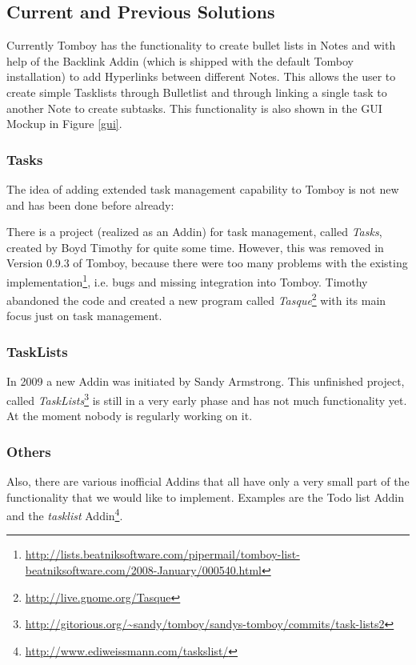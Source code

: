 \subsection{Current and Previous Solutions}
\label{description:solution}
Currently Tomboy has the functionality to create bullet lists in Notes and with help of the Backlink Addin (which is shipped with the default Tomboy installation) to add Hyperlinks between different Notes. This allows the user to create simple Tasklists through Bulletlist and through linking a single task to another Note to create subtasks. This functionality is also shown in the GUI Mockup in Figure \ref{gui}.

\subsubsection{Tasks} The idea of adding extended task management capability to Tomboy is not new and has been done before already:

There is a project (realized as an Addin) for task management, called \textit{Tasks}, created by Boyd Timothy for quite some time. However, this was removed in Version 0.9.3 of Tomboy, because there were too many problems with the existing implementation\footnote{\url{http://lists.beatniksoftware.com/pipermail/tomboy-list-beatniksoftware.com/2008-January/000540.html}}, i.e. bugs and missing integration into Tomboy.
Timothy abandoned the code and created a new program called \textit{Tasque}\footnote{\url{http://live.gnome.org/Tasque}} with its main focus just on task management.

\subsubsection{TaskLists}
In 2009 a new Addin was initiated by Sandy Armstrong. This unfinished project, called \textit{TaskLists}\footnote{\url{http://gitorious.org/~sandy/tomboy/sandys-tomboy/commits/task-lists2}} is still in a very early phase and has not much functionality yet. At the moment nobody is regularly working on it.

\subsubsection{Others}
Also, there are various inofficial Addins that all have only a very small part of the functionality that we would like to implement. Examples are the Todo %
list Addin and the \textit{tasklist} Addin\footnote{\url{http://www.ediweissmann.com/taskslist/}}.

